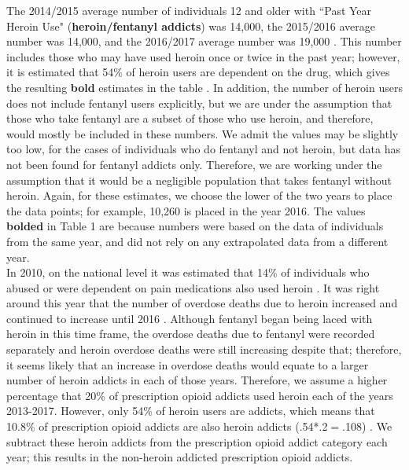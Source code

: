\documentclass[12pt]{article}
\begin{document}
The 2014/2015 average number of individuals 12 and older with ``Past Year Heroin Use" (\textbf{heroin/fentanyl addicts}) was 14,000, the 2015/2016 average number was 14,000, and the 2016/2017 average number was 19,000 \cite{NSDUH0, NSDUH2, NSDUH3}.  This number includes those who may have used heroin once or twice in the past year; however, it is estimated that 54\% of heroin users are dependent on the drug, which gives the resulting \textbf{bold} estimates in the table \cite{DrugAbuse}. In addition, the number of heroin users does not include fentanyl users explicitly, but we are under the assumption that those who take fentanyl are a subset of those who use heroin, and therefore, would mostly be included in these numbers. We admit the values may be slightly too low, for the cases of individuals who do fentanyl and not heroin, but data has not been found for fentanyl addicts only. Therefore, we are working under the assumption that it would be a negligible population that takes fentanyl without heroin. Again, for these estimates, we choose the lower of the two years to place the data points; for example, 10,260 is placed in the year 2016. The values \textbf{bolded} in Table 1 are because numbers were based on the data of individuals from the same year, and did not rely on any extrapolated data from a different year. \\

In 2010, on the national level it was estimated that 14\% of individuals who abused or were dependent on pain medications also used heroin \cite{DrugAbuse}. It was right around this year that the number of overdose deaths due to heroin increased and continued to increase until 2016 \cite{TNgov1, CDC4}. Although fentanyl began being laced with heroin in this time frame, the overdose deaths due to fentanyl were recorded separately and heroin overdose deaths were still increasing despite that; therefore, it seems likely that an increase in overdose deaths would equate to a larger number of heroin addicts in each of those years. Therefore, we assume a higher percentage that 20\% of prescription opioid addicts used heroin each of the years 2013-2017. However, only 54\% of heroin users are addicts, which means that 10.8\% of prescription opioid addicts are also heroin addicts (.54*.2$=$.108) \cite{DrugAbuse}. We subtract these heroin addicts from the prescription opioid addict category each year; this results in the non-heroin addicted prescription opioid addicts. \\
\end{document}
